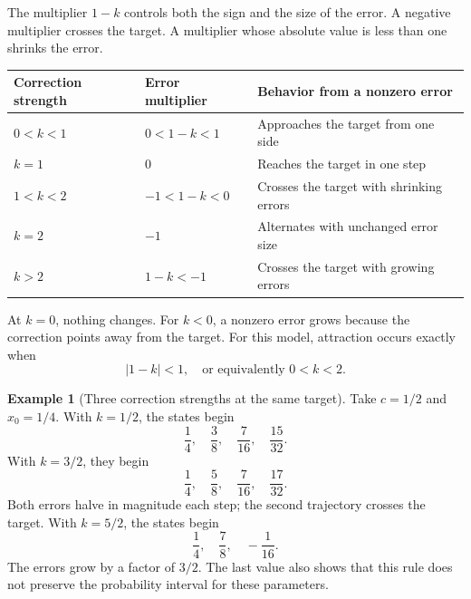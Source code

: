 \documentclass[11pt,oneside,openany]{book}
\theoremstyle{definition}
\newtheorem{example}{Example}[chapter]
\theoremstyle{remark}
\numberwithin{equation}{chapter}
\begin{document}
The multiplier \(1-k\) controls both the sign and the size of the error. A negative multiplier crosses the target. A multiplier whose absolute value is less than one shrinks the error.

\begin{longtable}[]{@{}
  >{\raggedright\arraybackslash}p{}
  >{\raggedright\arraybackslash}p{}
  >{\raggedright\arraybackslash}p{}@{}}
\toprule\noalign{}
\begin{minipage}[b]{\linewidth}\raggedright
Correction strength
\end{minipage} & \begin{minipage}[b]{\linewidth}\raggedright
Error multiplier
\end{minipage} & \begin{minipage}[b]{\linewidth}\raggedright
Behavior from a nonzero error
\end{minipage} \\
\midrule\noalign{}
\endhead
\bottomrule\noalign{}
\endlastfoot
\(0<k<1\) & \(0<1-k<1\) & Approaches the target from one side \\
\(k=1\) & \(0\) & Reaches the target in one step \\
\(1<k<2\) & \(-1<1-k<0\) & Crosses the target with shrinking errors \\
\(k=2\) & \(-1\) & Alternates with unchanged error size \\
\(k>2\) & \(1-k<-1\) & Crosses the target with growing errors \\
\end{longtable}

At \(k=0\), nothing changes. For \(k<0\), a nonzero error grows because the correction points away from the target. For this model, attraction occurs exactly when \[\boxed{|1-k|<1,\quad\text{or equivalently }0<k<2.}\]

\begin{example}[Three correction strengths at the same target]

Take \(c=1/2\) and \(x_0=1/4\). With \(k=1/2\), the states begin \[\frac14,\quad\frac38,\quad\frac7{16},\quad\frac{15}{32}.\] With \(k=3/2\), they begin \[\frac14,\quad\frac58,\quad\frac7{16},\quad\frac{17}{32}.\] Both errors halve in magnitude each step; the second trajectory crosses the target. With \(k=5/2\), the states begin \[\frac14,\quad\frac78,\quad-\frac1{16}.\] The errors grow by a factor of \(3/2\). The last value also shows that this rule does not preserve the probability interval for these parameters.

\end{example}
\end{document}
